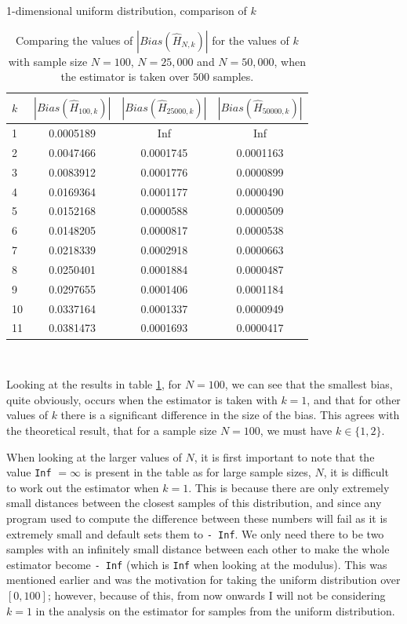 \documentclass[12pt]{report}
\begin{document}
\begin{table}
\caption{1-dimensional uniform distribution, comparison of $k$} \label{uniform_kcompare_table}
\begin{center}
\begin{tabular}{| l | c c c |} 
\toprule
$k$ &  $|Bias(\hat{H}_{100, k})|$ & $|Bias(\hat{H}_{25000, k})|$  &  $|Bias(\hat{H}_{50000, k})|$ \\
\midrule[1pt]
1     & 0.0005189    &       Inf    &       Inf   \\
2     & 0.0047466    & 0.0001745    & 0.0001163   \\
3     & 0.0083912    & 0.0001776    & 0.0000899   \\
4     & 0.0169364    & 0.0001177    & 0.0000490   \\
5     & 0.0152168    & 0.0000588    & 0.0000509   \\
6     & 0.0148205    & 0.0000817    & 0.0000538   \\
7     & 0.0218339    & 0.0002918    & 0.0000663   \\
8     & 0.0250401    & 0.0001884    & 0.0000487   \\
9     & 0.0297655    & 0.0001406    & 0.0001184   \\
10    & 0.0337164    & 0.0001337    & 0.0000949   \\
11    & 0.0381473    & 0.0001693    & 0.0000417   \\
\hline
\end{tabular}
\\[10pt]
\caption*{Comparing the values of $|Bias(\hat{H}_{N, k})|$ for the values of $k$ with sample size $N=100$, $N=25,000$ and $N=50,000$, when the estimator is taken over $500$ samples.}
\end{center}
\end{table}

Looking at the results in table \ref{uniform_kcompare_table}, for $N=100$, we can see that the smallest bias, quite obviously, occurs when the estimator is taken with $k=1$, and that for other values of $k$ there is a significant difference in the size of the bias. This agrees with the theoretical result, that for a sample size $N=100$, we must have $k \in \{1, 2\}$.

When looking at the larger values of $N$, it is first important to note that the value \texttt{Inf} $= \infty$ is present in the table as for large sample sizes, $N$, it is difficult to work out the estimator when $k=1$. This is because there are only extremely small distances between the closest samples of this distribution, and since any program used to compute the difference between these numbers will fail as it is extremely small and default sets them to \texttt{- Inf}. We only need there to be two samples with an infinitely small distance between each other to make the whole estimator become \texttt{- Inf} (which is \texttt{Inf} when looking at the modulus). This was mentioned earlier and was the motivation for taking the uniform distribution over $[0, 100]$; however, because of this, from now onwards I will not be considering $k=1$ in the analysis on the estimator for samples from the uniform distribution.
\end{document}
